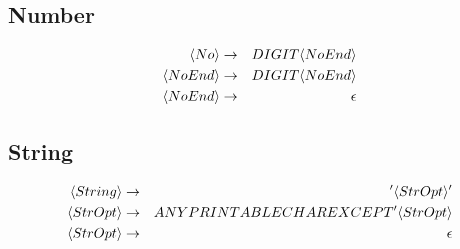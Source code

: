 \documentclass[a4paper,12pt]{article}
\newcommand{\nonterminal}[1]{\langle #1 \rangle}
\begin{document}
\subsection*{Number}
                            
\begin{eqnarray}
\setcounter{equation}{1}
\nonterminal{No} 			&	\to	&	 DIGIT \nonterminal{NoEnd}	\\
\nonterminal{NoEnd} 		&	\to	&	 DIGIT \nonterminal{NoEnd}	\\
\nonterminal{NoEnd} 		&	\to	&	 \epsilon
\end{eqnarray}

\subsection*{String}
                            
\begin{eqnarray}
\setcounter{equation}{1}
\nonterminal{String} 	&	\to	&	 ' \nonterminal{StrOpt} '	\\
\nonterminal{StrOpt} 	&	\to	&	 ANY PRINTABLE CHAR EXCEPT ' \nonterminal{StrOpt}	\\
\nonterminal{StrOpt} 	&	\to	&	 \epsilon
\end{eqnarray}
 
\end{document}
